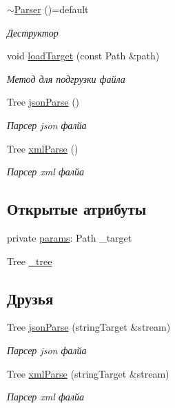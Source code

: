 \begin{DoxyCompactItemize}
\mbox{\label{classJarvis_1_1Parser_a7ff8a13f47d05e0fe46ce9b90cf596fd}} 
\hyperlink{classJarvis_1_1Parser_a7ff8a13f47d05e0fe46ce9b90cf596fd}{$\sim$\+Parser} ()=default
\begin{DoxyCompactList}\small\item\em Деструктор \end{DoxyCompactList}\item 
void \hyperlink{classJarvis_1_1Parser_ae2e8ce2a61c865342619fffe478dcda3}{load\+Target} (const Path \&path)
\begin{DoxyCompactList}\small\item\em Метод для подгрузки файла \end{DoxyCompactList}\item 
Tree \hyperlink{classJarvis_1_1Parser_a6d9a642092d5b7806b19ea6ccd98a515}{json\+Parse} ()
\begin{DoxyCompactList}\small\item\em Парсер json фалйа \end{DoxyCompactList}\item 
Tree \hyperlink{classJarvis_1_1Parser_ae970d807833a09eb01ac2bb3367560b7}{xml\+Parse} ()
\begin{DoxyCompactList}\small\item\em Парсер xml фалйа \end{DoxyCompactList}\end{DoxyCompactItemize}
\subsection*{Открытые атрибуты}
\begin{DoxyCompactItemize}
\item 
private \hyperlink{classJarvis_1_1Parser_a60503f54d37de6bc5eac1e6cb0c79c88}{params}\+: Path \+\_\+target
\item 
Tree \hyperlink{classJarvis_1_1Parser_aaa45f2682e516630116ab3a80028d0d4}{\+\_\+tree}
\end{DoxyCompactItemize}
\subsection*{Друзья}
\begin{DoxyCompactItemize}
\item 
Tree \hyperlink{classJarvis_1_1Parser_ac52ba088bbd034ec108efce6c8f48e17}{json\+Parse} (string\+Target \&stream)
\begin{DoxyCompactList}\small\item\em Парсер json фалйа \end{DoxyCompactList}\item 
Tree \hyperlink{classJarvis_1_1Parser_a6f226036ccce1dd03cab22a3214374f4}{xml\+Parse} (string\+Target \&stream)
\begin{DoxyCompactList}\small\item\em Парсер xml фалйа \end{DoxyCompactList}\end{DoxyCompactItemize}


